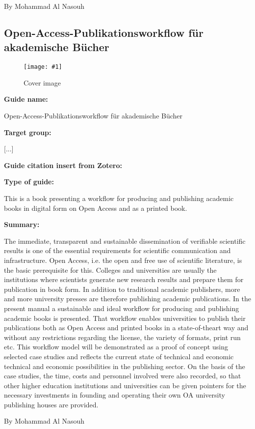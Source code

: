 \documentclass{article}
\newlength{\imgwidth}
\newcommand\scaledgraphics[2]{%
                
\settowidth{\imgwidth}{\texttt{[image: \#1]}}%
                
\setlength{\imgwidth}{\minof{\imgwidth}{#2\textwidth}}%
                
\texttt{[image: \#1]}%
                
}
\begin{document}
By Mohammad Al Nasouh 





\subsection{Open-Access-Publikationsworkflow für akademische Bücher}\label{H6691479}



\begin{center}
\begin{figure}
\scaledgraphics{39363ae5-01d9-4e5a-a46f-bf20971df65a.jpg}{0.5}
\caption*{Cover image}\label{F7674061}
\end{figure}


\end{center}




\textbf{Guide name:} 

Open-Access-Publikationsworkflow für akademische Bücher


\textbf{Target group:}

[...]


\textbf{Guide citation insert from Zotero:}

\autocite{bohm_open-access-publikationsworkflow_2020}


\textbf{Type of guide: }

This is a book presenting a workflow for producing and publishing academic books in digital form on Open Access and as a printed book.


\textbf{Summary: }

The immediate, transparent and sustainable dissemination of verifiable scientific results is one of the essential requirements for scientific communication and infrastructure. Open Access, i.e. the open and free use of scientific literature, is the basic prerequisite for this. Colleges and universities are usually the institutions where scientists generate new research results and prepare them for publication in book form. In addition to traditional academic publishers, more and more university presses are therefore publishing academic publications. In the present manual a sustainable and ideal workflow for producing and publishing academic books is presented. That workflow enables universities to publish their publications both as Open Access and printed books in a state-of-theart way and without any restrictions regarding the license, the variety of formats, print run etc. This workflow model will be demonstrated as a proof of concept using selected case studies and reflects the current state of technical and economic technical and economic possibilities in the publishing sector. On the basis of the case studies, the time, costs and personnel involved were also recorded, so that other higher education institutions and universities can be given pointers for the necessary investments in founding and operating their own OA university publishing houses are provided.


By Mohammad Al Nasouh





\printbibliography[title={Literaturverzeichnis}]
\end{document}
